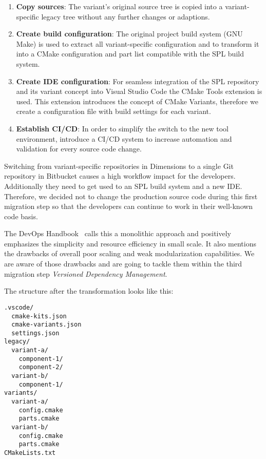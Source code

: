 \begin{enumerate}
  \item \textbf{Copy sources}: The variant's original source tree is copied
        into a variant-specific legacy tree without any further changes or
        adaptions.
  \item \textbf{Create build configuration}: The original project build
        system (GNU Make) is used to extract all variant-specific configuration and
        to transform it into a CMake configuration and part list compatible with
        the SPL build system.
  \item \textbf{Create IDE configuration}: For seamless integration of the SPL
        repository and its variant concept into Visual Studio Code the
        CMake Tools extension is used. This extension introduces the concept of CMake
        Variants, therefore we create a configuration file with build settings
        for each variant.
  \item \textbf{Establish CI/CD}: In order to simplify the switch to the new
        tool environment, introduce a CI/CD system to increase automation and
        validation for every source code change.
\end{enumerate}

Switching from variant-specific repositories in Dimensions to a single Git
repository in Bitbucket causes a high workflow impact for the developers.
Additionally they need to get used to an SPL build system and a new IDE.\@
Therefore, we decided not to change the production source code during this first
migration step so that the developers can continue to work in their well-known
code basis.

The DevOps Handbook~\cite{devopshandbook} calls this a monolithic approach and
positively emphasizes the simplicity and resource efficiency in small scale. It
also mentions the drawbacks of overall poor scaling and weak modularization
capabilities. We are aware of those drawbacks and are going to tackle them
within the third migration step \textit{Versioned Dependency Management}.

The structure after the transformation looks like this:
\begin{Verbatim}[frame=single,samepage=true]
.vscode/
  cmake-kits.json
  cmake-variants.json
  settings.json
legacy/
  variant-a/
    component-1/
    component-2/
  variant-b/
    component-1/
variants/
  variant-a/
    config.cmake
    parts.cmake
  variant-b/
    config.cmake
    parts.cmake
CMakeLists.txt
\end{Verbatim}


